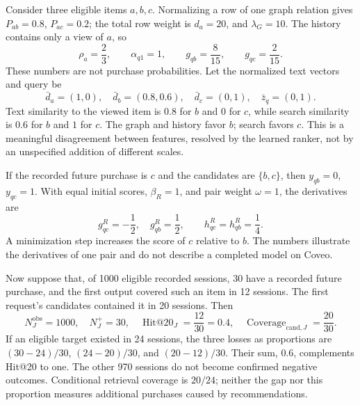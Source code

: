 \documentclass[12pt,a4paper]{article}
\theoremstyle{plainru}
\begin{document}
Consider three eligible items $a,b,c$. Normalizing a row
of one graph relation gives $P_{ab}=0.8$, $P_{ac}=0.2$;
the total row weight is $d_a=20$, and $\lambda_G=10$.
The history contains only a view of $a$, so
\begin{equation}\label{eq:app-graph-example}
\rho_a=\frac23,\qquad \alpha_{q1}=1,\qquad
g_{qb}=\frac{8}{15},\qquad g_{qc}=\frac{2}{15}.
\end{equation}
These numbers are not purchase probabilities.
Let the normalized text vectors and query be
\begin{equation}\label{eq:app-content-example}
\bar d_a=(1,0),\quad \bar d_b=(0.8,0.6),\quad
\bar d_c=(0,1),\quad\bar z_q=(0,1).
\end{equation}
Text similarity to the viewed item is $0.8$ for $b$
and $0$ for $c$, while search similarity is $0.6$ for $b$ and $1$ for $c$.
The graph and history favor $b$; search favors $c$.
This is a meaningful disagreement between features, resolved by the learned
ranker, not by an unspecified addition of different scales.

If the recorded future purchase is $c$ and the candidates are $\{b,c\}$, then
$y_{qb}=0$, $y_{qc}=1$. With equal initial scores,
$\beta_R=1$, and pair weight $\omega=1$, the derivatives are
\begin{equation}\label{eq:app-gradient-example}
g^R_{qc}=-\frac12,\quad g^R_{qb}=\frac12,
\qquad h^R_{qc}=h^R_{qb}=\frac14.
\end{equation}
A minimization step increases the score of $c$ relative to $b$.
The numbers illustrate the derivatives of one pair and do not describe
a completed model on Coveo.

Now suppose that, of 1000 eligible recorded sessions, 30 have
a recorded future purchase, and the first output covered such
an item in 12 sessions. The first request's candidates contained it in 20 sessions.
Then
\begin{equation}\label{eq:app-proxy-example}
N_J^{\mathrm{obs}}=1000,\quad N_J^+=30,\quad
\operatorname{Hit@20}_J=\frac{12}{30}=0.4,\quad
\operatorname{Coverage}_{\mathrm{cand},J}=\frac{20}{30}.
\end{equation}
If an eligible target existed in 24 sessions, the three losses as proportions are
$(30-24)/30$, $(24-20)/30$, and $(20-12)/30$. Their sum, $0.6$,
complements Hit@20 to one. The other 970 sessions do not become
confirmed negative outcomes.
Conditional retrieval coverage is $20/24$; neither the gap nor this proportion
measures additional purchases caused by recommendations.
\end{document}
